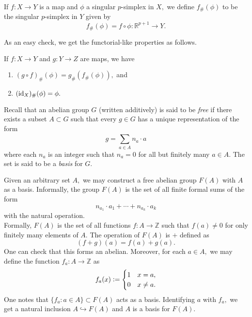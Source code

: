 \documentclass[12pt]{article}
\begin{document}
\begin{defn}
	If $f:X\to Y$ is a map and $\phi$ a singular $p$-simplex in $X,$ we define $f_\#(\phi)$ to be the singular $p$-simplex in $Y$ given by
	\begin{equation*} 
		f_\#(\phi) = f \circ \phi : \mathbb{R}^{p+1} \to Y.
	\end{equation*}
\end{defn}

As an easy check, we get the functorial-like properties as follows.

\begin{prop} \label{prop:funtoralikehash}
	If $f:X\to Y$ and $g:Y\to Z$ are maps, we have
	\begin{enumerate}
		\item $(g\circ f)_\#(\phi) = g_\#(f_\#(\phi)),$ and
		\item $(\operatorname{id}_X)_\#(\phi) = \phi.$
	\end{enumerate}
\end{prop}

Recall that an abelian group $G$ (written additively) is said to be \emph{free} if there exists a subset $A \subset G$ such that every $g \in G$ has a unique representation of the form
\begin{equation*} 
	g = \sum_{a\in A}^{}n_a\cdot a
\end{equation*}
where each $n_a$ is an integer such that $n_a = 0$ for all but finitely many $a \in A.$ The set is said to be a \emph{basis} for $G.$

Given an arbitrary set $A,$ we may construct a free abelian group $F(A)$ with $A$ as a basis. Informally, the group $F(A)$ is the set of all finite formal sums of the form
\begin{equation*} 
	n_{a_1}\cdot a_1 + \cdots + n_{a_k}\cdot a_k
\end{equation*}
with the natural operation.\\
Formally, $F(A)$ is the set of all functions $f:A\to\mathbb{Z}$ such that $f(a) \neq 0$ for only finitely many elements of $A.$ The operation of $F(A)$ is $+$ defined as
\begin{equation*} 
	(f + g)(a) = f(a) + g(a).
\end{equation*}
One can check that this forms an abelian. Moreover, for each $a \in A,$ we may define the function $f_a:A \to \mathbb{Z}$ as
\begin{equation*} 
	f_a(x) \vcentcolon= \begin{cases}
		1 & x = a,\\
		0 & x \neq a.
	\end{cases}
\end{equation*}
One notes that $\{f_a : a \in A\} \subset F(A)$ acts as a basis. Identifying $a$ with $f_a,$ we get a natural inclusion $A \hookrightarrow F(A)$ and $A$ is a basis for $F(A).$
\end{document}
